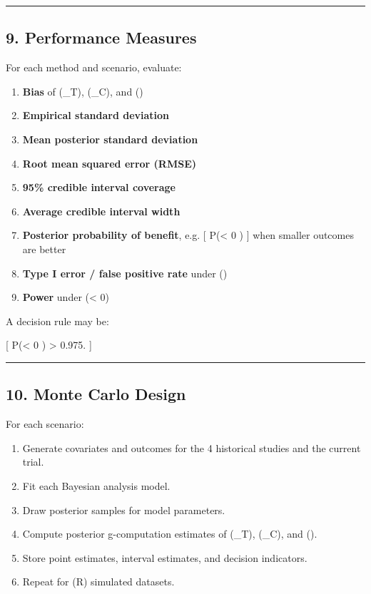 \documentclass[
  letterpaper,
  DIV=11,
  numbers=noendperiod]{scrartcl}
\providecommand{\tightlist}{%
  \setlength{\itemsep}{0pt}\setlength{\parskip}{0pt}}
\begin{document}
\begin{center}\rule{0.5\linewidth}{0.5pt}\end{center}

\subsection{9. Performance Measures}\label{performance-measures}

For each method and scenario, evaluate:

\begin{enumerate}
\def\labelenumi{\arabic{enumi}.}
\tightlist
\item
  \textbf{Bias} of (\hat\mu\_T), (\hat\mu\_C), and (\hat\Delta)
\item
  \textbf{Empirical standard deviation}
\item
  \textbf{Mean posterior standard deviation}
\item
  \textbf{Root mean squared error (RMSE)}
\item
  \textbf{95\% credible interval coverage}
\item
  \textbf{Average credible interval width}
\item
  \textbf{Posterior probability of benefit}, e.g. {[}
  P(\Delta \textless{} 0 \mid {}) {]} when smaller outcomes are
  better
\item
  \textbf{Type I error / false positive rate} under ()
\item
  \textbf{Power} under (\tau \textless{} 0)
\end{enumerate}

A decision rule may be:

{[}  P(\Delta \textless{} 0 \mid {})
\textgreater{} 0.975. {]}

\begin{center}\rule{0.5\linewidth}{0.5pt}\end{center}

\subsection{10. Monte Carlo Design}\label{monte-carlo-design}

For each scenario:

\begin{enumerate}
\def\labelenumi{\arabic{enumi}.}
\tightlist
\item
  Generate covariates and outcomes for the 4 historical studies and the
  current trial.
\item
  Fit each Bayesian analysis model.
\item
  Draw posterior samples for model parameters.
\item
  Compute posterior g-computation estimates of (\mu\_T), (\mu\_C), and
  (\Delta).
\item
  Store point estimates, interval estimates, and decision indicators.
\item
  Repeat for (R) simulated datasets.
\end{enumerate}
\end{document}
